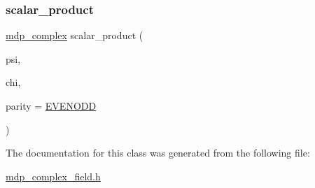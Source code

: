 \subsubsection{\texorpdfstring{scalar\+\_\+product}{scalar\_product}}
{\footnotesize\ttfamily \hyperlink{classmdp__complex}{mdp\+\_\+complex} scalar\+\_\+product (\begin{DoxyParamCaption}\item[{\hyperlink{classmdp__complex__field}{mdp\+\_\+complex\+\_\+field} \&}]{psi,  }\item[{\hyperlink{classmdp__complex__field}{mdp\+\_\+complex\+\_\+field} \&}]{chi,  }\item[{int}]{parity = {\ttfamily \hyperlink{mdp__global__vars_8h_a4c9de81f2de5a74b588107b6c0afb9ee}{E\+V\+E\+N\+O\+DD}} }\end{DoxyParamCaption})\hspace{0.3cm}{\ttfamily [friend]}}



The documentation for this class was generated from the following file\+:\begin{DoxyCompactItemize}
\item 
\hyperlink{mdp__complex__field_8h}{mdp\+\_\+complex\+\_\+field.\+h}\end{DoxyCompactItemize}
